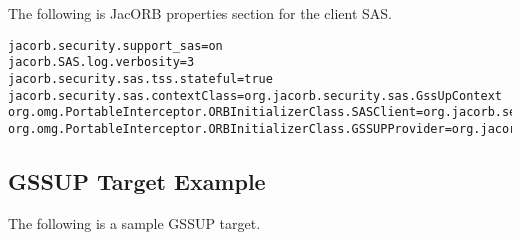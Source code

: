The following is JacORB properties section for the client SAS.

\begin{scriptsize}
\begin{verbatim}
jacorb.security.support_sas=on
jacorb.SAS.log.verbosity=3
jacorb.security.sas.tss.stateful=true
jacorb.security.sas.contextClass=org.jacorb.security.sas.GssUpContext
org.omg.PortableInterceptor.ORBInitializerClass.SASClient=org.jacorb.security.sas.SASClientInitializer
org.omg.PortableInterceptor.ORBInitializerClass.GSSUPProvider=org.jacorb.security.sas.GSSUPProviderInitializer
\end{verbatim}
\end{scriptsize}

\subsection{GSSUP Target Example}

The following is a sample GSSUP target.

